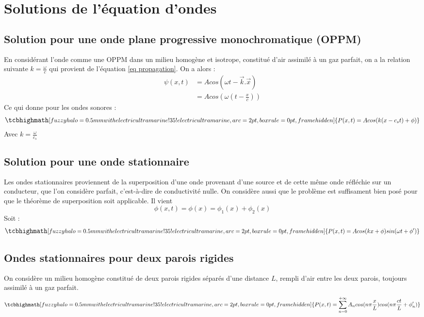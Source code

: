 \section{Solutions de l'équation d'ondes}
\subsection{Solution pour une onde plane progressive monochromatique (OPPM)}
En considérant l'onde comme une OPPM dans un milieu homogène et isotrope, constitué d'air assimilé à un gaz parfait, on a la relation suivante $k = \frac{\omega}{c}$ qui provient de l'équation \eqref{eq propagation}. On a alors :
\begin{align}
    \psi(x,t) &= Acos(\omega t - \vec{k}.\vec{x}) \\ \nonumber
        &= Acos(\omega(t - \frac{x}{c})) \nonumber
\end{align}
Ce qui donne pour les ondes sonores :
\begin{equation}
    \large
    \tcbhighmath[fuzzy halo=0.5mm with electricultramarine!35!electricultramarine,arc=2pt,
    boxrule=0pt,frame hidden]{ 
        P(x,t) = Acos(k(x - c_{s}t) + \phi)
     } \nonumber
    \normalsize
\end{equation}
Avec $k=\frac{\omega}{c_{s}}$
\subsection{Solution pour une onde stationnaire}
Les ondes stationnaires proviennent de la superposition d'une onde provenant d'une source et de cette même onde réfléchie sur un conducteur, que l'on considère parfait, c'est-à-dire de conductivité nulle. On considère aussi que le problème est suffisament bien posé pour que le théorème de superposition soit applicable. Il vient 
\begin{equation}
    \phi(x,t)=\phi(x)=\phi_{1}(x)+\phi_{2}(x)
\end{equation}
Soit :
\begin{equation}
    \large
    \tcbhighmath[fuzzy halo=0.5mm with electricultramarine!35!electricultramarine,arc=2pt,
    boxrule=0pt,frame hidden]{ 
        P(x,t) = Acos(kx + \phi)sin(\omega t + \phi')
     } \nonumber
    \normalsize
\end{equation}
\subsection{Ondes stationnaires pour deux parois rigides}
On considère un milieu homogène constitué de deux parois rigides séparés d'une distance $L$, rempli d'air entre les deux parois, toujours assimilé à un gaz parfait.
\begin{equation}
    \normalsize
    \tcbhighmath[fuzzy halo=0.5mm with electricultramarine!35!electricultramarine,arc=2pt,
    boxrule=0pt,frame hidden]{ 
        P(x,t) = \sum_{n=0}^{+\infty}{A_{n}cos(n\pi \frac{x}{L})cos(n\pi \frac{ct}{L} + \phi_{n}')}
     } \nonumber
    \normalsize
\end{equation}
